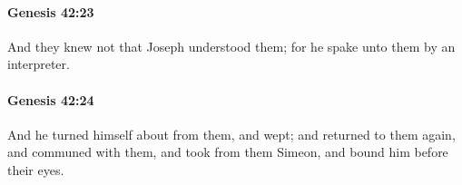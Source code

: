 		\paragraph{Genesis 42:23} %
			\label{GENESIS-42-23}

			And they knew not that Joseph understood them; for he spake unto them by an interpreter.


		\paragraph{Genesis 42:24} %
			\label{GENESIS-42-24}

			And he turned himself about from them, and wept; and returned to them again, and communed with them, and took from them Simeon, and bound him before their eyes.


